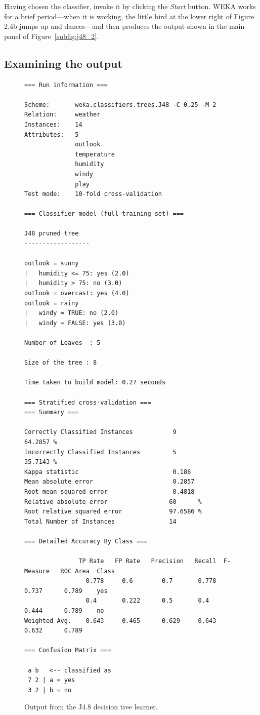 Having chosen the classifier, invoke it by clicking the \textit{Start}
button. WEKA works for a brief period---when it is working, the little
bird at the lower right of Figure 2.4b jumps up and dances---and then
produces the output shown in the main panel of
Figure~\ref{subfig:j48_2}.

\subsection{Examining the output}

\begin{figure}[!th]
\begin{mdframed}[innermargin=-1cm]
\begin{Verbatim}[fontsize=\footnotesize]
=== Run information ===

Scheme:       weka.classifiers.trees.J48 -C 0.25 -M 2
Relation:     weather
Instances:    14
Attributes:   5
              outlook
              temperature
              humidity
              windy
              play
Test mode:    10-fold cross-validation

=== Classifier model (full training set) ===

J48 pruned tree
------------------

outlook = sunny
|   humidity <= 75: yes (2.0)
|   humidity > 75: no (3.0)
outlook = overcast: yes (4.0)
outlook = rainy
|   windy = TRUE: no (2.0)
|   windy = FALSE: yes (3.0)

Number of Leaves  : 5

Size of the tree : 8

Time taken to build model: 0.27 seconds

=== Stratified cross-validation ===
=== Summary ===

Correctly Classified Instances           9               64.2857 %
Incorrectly Classified Instances         5               35.7143 %
Kappa statistic                          0.186 
Mean absolute error                      0.2857
Root mean squared error                  0.4818
Relative absolute error                 60      %
Root relative squared error             97.6586 %
Total Number of Instances               14     

=== Detailed Accuracy By Class ===

               TP Rate   FP Rate   Precision   Recall  F-Measure   ROC Area  Class
                 0.778     0.6        0.7       0.778     0.737      0.789    yes
                 0.4       0.222      0.5       0.4       0.444      0.789    no
Weighted Avg.    0.643     0.465      0.629     0.643     0.632      0.789

=== Confusion Matrix ===

 a b   <-- classified as
 7 2 | a = yes
 3 2 | b = no
\end{Verbatim}
\end{mdframed}
\caption{\label{fig:j48_output}Output from the J4.8 decision tree learner.}
\end{figure}


